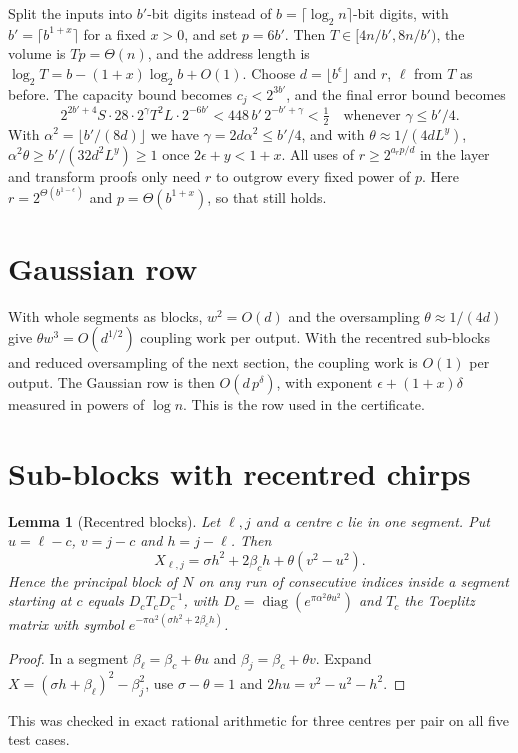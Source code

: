\documentclass[11pt]{article}
\newtheorem{lemma}{Lemma}
\theoremstyle{remark}\newtheorem*{remark}{Remark}
\begin{document}
Split the inputs into $b'$-bit digits instead of $b=\lceil\log_2n\rceil$-bit digits, with
$b'=\lceil b^{1+x}\rceil$ for a fixed $x>0$, and set $p=6b'$. Then $T\in[4n/b',8n/b')$,
the volume is $Tp=\Theta(n)$, and the address length is $\log_2T=b-(1+x)\log_2b+O(1)$.
Choose $d=\lfloor b^\epsilon\rfloor$ and $r$, $\ell$ from $T$ as before.
The capacity bound becomes $c_j<2^{3b'}$, and the final error bound becomes
\[
 2^{2b'+4}S\cdot28\cdot2^\gamma T^2L\cdot2^{-6b'}<448\,b'\,2^{-b'+\gamma}<\tfrac12
 \quad\text{whenever }\gamma\le b'/4 .
\]
With $\alpha^2=\lfloor b'/(8d)\rfloor$ we have $\gamma=2d\alpha^2\le b'/4$, and with
$\theta\approx1/(4dL^y)$, $\alpha^2\theta\ge b'/(32d^2L^y)\ge1$ once $2\epsilon+y<1+x$. All uses of
$r\ge2^{a_rp/d}$ in the layer and transform proofs only need $r$ to outgrow every fixed
power of $p$. Here $r=2^{\Theta(b^{1-\epsilon})}$ and $p=\Theta(b^{1+x})$, so that still holds.

\section{Gaussian row}

With whole segments as blocks, $w^2=O(d)$ and the oversampling $\theta\approx1/(4d)$ give
$\theta w^3=O(d^{1/2})$ coupling work per output. With the recentred sub-blocks and reduced
oversampling of the next section, the coupling work is $O(1)$ per output. The Gaussian row is
then $O(d\,p^\delta)$, with exponent $\epsilon+(1+x)\delta$ measured in powers of $\log n$. This
is the row used in the certificate.

\section{Sub-blocks with recentred chirps}

\begin{lemma}[Recentred blocks]\label{lem:recentred}
Let $\ell,j$ and a centre $c$ lie in one segment. Put $u=\ell-c$, $v=j-c$ and $h=j-\ell$. Then
\[
 X_{\ell,j}=\sigma h^2+2\beta_ch+\theta(v^2-u^2).
\]
Hence the principal block of $N$ on any run of consecutive indices inside a segment
starting at $c$ equals $D_cT_cD_c^{-1}$, with $D_c=\operatorname{diag}(e^{\pi\alpha^2\theta u^2})$ and
$T_c$ the Toeplitz matrix with symbol $e^{-\pi\alpha^2(\sigma h^2+2\beta_ch)}$.
\end{lemma}
\begin{proof}
In a segment $\beta_\ell=\beta_c+\theta u$ and $\beta_j=\beta_c+\theta v$. Expand
$X=(\sigma h+\beta_\ell)^2-\beta_j^2$, use $\sigma-\theta=1$ and $2hu=v^2-u^2-h^2$.
\end{proof}
This was checked in exact rational arithmetic for three centres per pair on all five test cases.
\end{document}
